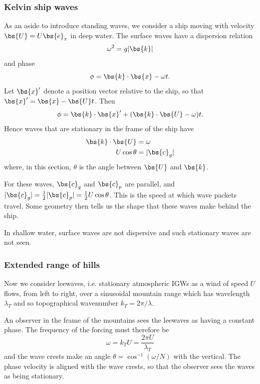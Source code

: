 \subsubsection{Kelvin ship waves}

As an aside to introduce standing waves, we consider a ship moving with velocity $\bs{U} = U\bs{e}_x$ in deep water. The surface waves have a dispersion relation
\begin{equation}
\omega^2 = g|\bs{k}|
\end{equation}
and phase
\begin{equation}
	\phi = \bs{k}\cdot\bs{x} - \omega t.
\end{equation}
Let $\bs{x}'$ denote a position vector relative to the ship, so that $\bs{x}' = \bs{x} - \bs{U}t$. Then
\begin{equation}
	\phi = \bs{k}\cdot\bs{x}' + (\bs{k}\cdot\bs{U} - \omega) t.
\end{equation}
Hence waves that are stationary in the frame of the ship have
\begin{align}
	\bs{k}\cdot\bs{U} &= \omega \\
	U\cos\theta &= |\bs{c}_g|
\end{align}
where, in this section, $\theta$ is the angle between $\bs{U}$ and $\bs{k}$. 

For these waves, $\bs{c}_g$ and $\bs{c}_p$ are parallel, and $|\bs{c}_g| = \frac{1}{2} |\bs{c}_p| = \frac{1}{2}U\cos\theta$. This is the speed at which wave packets travel. Some geometry then tells us the shape that these waves make behind the ship.

In shallow water, surface waves are not dispersive and such stationary waves are not seen.

\subsubsection{Extended range of hills}

Now we consider leewaves, i.e. stationary atmospheric IGWs as a wind of speed $U$ flows, from left to right, over a sinusoidal mountain range which has wavelength $\lambda_T$ and so topographical wavenumber $k_T = 2\pi/\lambda$. 

An observer in the frame of the mountains sees the leewaves as having a constant phase. The frequency of the forcing must therefore be
\begin{equation}
	\omega = k_T U = \frac{2\pi U}{\lambda_T}
\end{equation}
and the wave crests make an angle $\theta = \cos^{-1} (\omega/N)$ with the vertical. The phase velocity is aligned with the wave crests, so that the observer sees the waves as being stationary.

